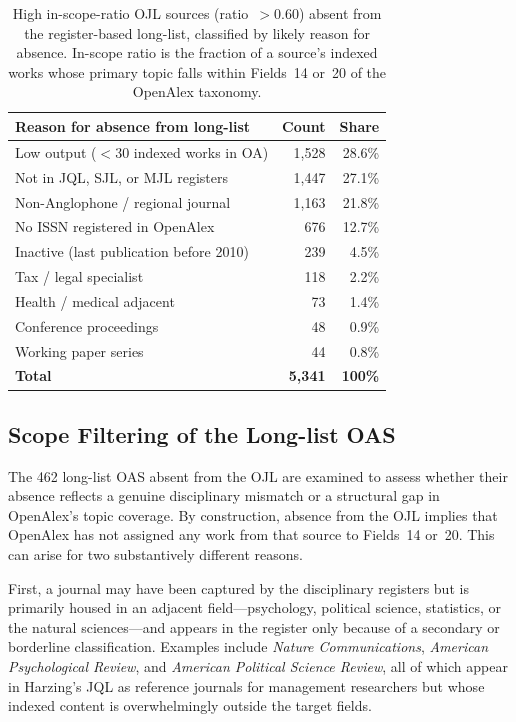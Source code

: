 \begin{table}[ht]
\centering
\caption{High in-scope-ratio OJL sources (ratio~$>0.60$) absent from the
         register-based long-list, classified by likely reason for absence.
         In-scope ratio is the fraction of a source's indexed works whose primary
         topic falls within Fields~14 or~20 of the OpenAlex taxonomy.}
\label{tab:ojl_unmatched}
\small
\begin{tabular}{lrr}
\toprule
\textbf{Reason for absence from long-list} & \textbf{Count} & \textbf{Share} \\
\midrule
Low output ($<$30 indexed works in OA)  & 1{,}528 & 28.6\% \\
Not in JQL, SJL, or MJL registers       & 1{,}447 & 27.1\% \\
Non-Anglophone / regional journal        & 1{,}163 & 21.8\% \\
No ISSN registered in OpenAlex          &   676   & 12.7\% \\
Inactive (last publication before 2010) &   239   &  4.5\% \\
Tax / legal specialist                   &   118   &  2.2\% \\
Health / medical adjacent                &    73   &  1.4\% \\
Conference proceedings                   &    48   &  0.9\% \\
Working paper series                     &    44   &  0.8\% \\
\midrule
\textbf{Total}                           & \textbf{5{,}341} & \textbf{100\%} \\
\bottomrule
\end{tabular}
\end{table}

\subsection{Scope Filtering of the Long-list OAS}
\label{sec:scope_filter}

The 462 long-list OAS absent from the OJL are examined to assess whether their
absence reflects a genuine disciplinary mismatch or a structural gap in OpenAlex's
topic coverage.
By construction, absence from the OJL implies that OpenAlex has not assigned any
work from that source to Fields~14 or~20.
This can arise for two substantively different reasons.

First, a journal may have been captured by the disciplinary registers but is
primarily housed in an adjacent field---psychology, political science, statistics,
or the natural sciences---and appears in the register only because of a secondary
or borderline classification.
Examples include \textit{Nature Communications}, \textit{American Psychological
Review}, and \textit{American Political Science Review}, all of which appear in
Harzing's JQL as reference journals for management researchers but whose indexed
content is overwhelmingly outside the target fields.

